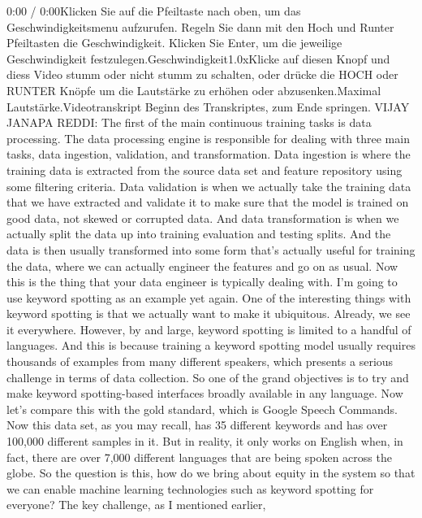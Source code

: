 {{{{    0:00 / 0:00Klicken Sie auf die Pfeiltaste nach oben, um das Geschwindigkeitsmenu aufzurufen. Regeln Sie dann mit den Hoch und Runter Pfeiltasten die Geschwindigkeit. Klicken Sie Enter, um die jeweilige Geschwindigkeit festzulegen.Geschwindigkeit1.0xKlicke auf diesen Knopf und diess Video stumm oder nicht stumm zu schalten, oder drücke die HOCH oder RUNTER Knöpfe um die Lautstärke zu erhöhen oder abzusenken.Maximal Lautstärke.Videotranskript
    Beginn des Transkriptes, zum Ende springen.
    VIJAY JANAPA REDDI: The first of the main continuous training tasks
    is data processing.
    The data processing engine is responsible for dealing
    with three main tasks, data ingestion, validation, and transformation.
    Data ingestion is where the training data
    is extracted from the source data set and feature repository
    using some filtering criteria.
    Data validation is when we actually take the training data
    that we have extracted and validate it to make sure
    that the model is trained on good data, not skewed or corrupted data.
    And data transformation is when we actually
    split the data up into training evaluation and testing splits.
    And the data is then usually transformed into some form that's
    actually useful for training the data, where we can actually engineer
    the features and go on as usual.
    Now this is the thing that your data engineer is typically dealing with.
    I'm going to use keyword spotting as an example yet again.
    One of the interesting things with keyword spotting
    is that we actually want to make it ubiquitous.
    Already, we see it everywhere.
    However, by and large, keyword spotting is limited to a handful of languages.
    And this is because training a keyword spotting model
    usually requires thousands of examples from many different speakers, which
    presents a serious challenge in terms of data collection.
    So one of the grand objectives is to try and make
    keyword spotting-based interfaces broadly available in any language.
    Now let's compare this with the gold standard,
    which is Google Speech Commands.
    Now this data set, as you may recall, has 35 different keywords
    and has over 100,000 different samples in it.
    But in reality, it only works on English when, in fact, there
    are over 7,000 different languages that are being spoken across the globe.
    So the question is this, how do we bring about equity in the system
    so that we can enable machine learning technologies
    such as keyword spotting for everyone?
    The key challenge, as I mentioned earlier,
}}}}
